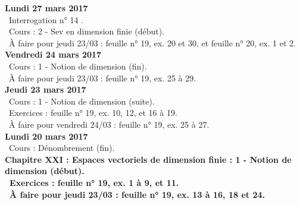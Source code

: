 \documentclass[12pt,a4paper]{article}
\begin{document}
% 
%  


\noindent\textbf{\bf Lundi 27 mars 2017} \\
\bu\ Interrogation n° 14 .\\
\bu\ Cours : 2 - Sev en dimension finie (début).\\
\bu\ À faire pour jeudi 23/03 : feuille n° 19, ex. 20 et 30, et feuille n° 20, ex. 1 et 2.\vspace{.4cm}\\

\noindent\textbf{Vendredi 24 mars 2017}\\
\bu\ Cours : 1 - Notion de dimension (fin).\\
\bu\ À faire pour jeudi 23/03 : feuille n° 19, ex. 25 à 29.\vspace{.4cm}\\

\noindent\textbf{Jeudi 23 mars 2017}\\
\bu\ Cours : 1 - Notion de dimension (suite).\\
\bu\ Exercices : feuille n° 19, ex. 10, 12, et 16 à 19.\\
\bu\ À faire pour vendredi 24/03 : feuille n° 19, ex. 25 à 27.\vspace{.4cm}\\

\noindent\textbf{\bf Lundi 20 mars 2017} \\
\bu\ Cours : Dénombrement (fin).\\
\bf Chapitre XXI \rm : Espaces vectoriels de dimension finie  : 1 - Notion de dimension (début).\\
\bu\ Exercices : feuille n° 19, ex. 1 à 9, et 11.\\
\bu\ À faire pour jeudi 23/03 : feuille n° 19, ex. 13 à 16, 18 et 24.\vspace{.4cm}\\
\end{document}

